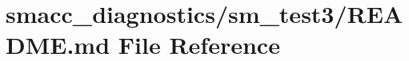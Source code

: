 \hypertarget{smacc__diagnostics_2sm__test3_2README_8md}{}\section{smacc\+\_\+diagnostics/sm\+\_\+test3/\+R\+E\+A\+D\+ME.md File Reference}
\label{smacc__diagnostics_2sm__test3_2README_8md}
